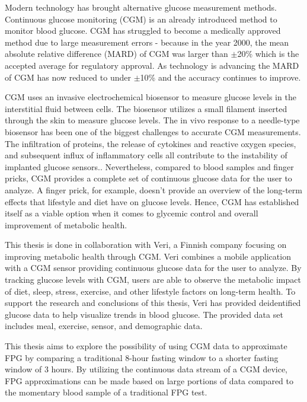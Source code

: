 \documentclass[english, 12pt, a4paper, elec, utf8, a-1b, online]{aaltothesis}
\begin{document}
Modern technology has brought alternative glucose measurement methods. 
Continuous glucose monitoring (CGM) is an already introduced method to 
monitor blood glucose\cite{danne_international_2017}. CGM 
has struggled to become a medically approved method due to
large measurement errors - because in the year 2000, the mean absolute relative difference
(MARD) of CGM was larger than $\pm$20\% which is the accepted average for 
regulatory approval. As technology is advancing the MARD of CGM has 
now reduced to under $\pm$10\% and the accuracy continues to improve\cite{rodbard_continuous_2016}\cite{gifford_cgm}.

CGM uses an invasive electrochemical biosensor to measure glucose levels
in the interstitial fluid between cells.
The biosensor utilizes a small filament inserted through the skin 
to measure glucose levels. The in vivo response to a needle-type 
biosensor has been one of the biggest challenges to accurate CGM
measurements. The infiltration of proteins, the release of cytokines 
and reactive oxygen species, and subsequent influx of 
inflammatory cells all contribute to the instability of implanted 
glucose sensors.\cite{gifford_cgm}. Nevertheless, compared to
blood samples and finger pricks, CGM provides a complete set 
of continuous glucose data for the user to analyze. A finger
prick, for example, doesn't provide an overview of the long-term
effects that lifestyle and diet have on glucose levels. Hence, CGM
has established itself as a viable option when it comes to 
glycemic control and overall improvement of metabolic health. 

This thesis is done in collaboration 
with Veri\cite{noauthor_veri_nodate}, a Finnish company focusing on improving 
metabolic health through CGM. Veri combines a mobile application with a CGM 
sensor providing continuous glucose data for the user to analyze. By tracking 
glucose levels with CGM, users are able to observe the metabolic impact
of diet, sleep, stress, exercise, and other lifestyle factors on long-term health. 
To support the research and conclusions of this thesis, Veri has 
provided deidentified glucose data to help visualize trends in blood glucose. The provided data set
includes meal, exercise, sensor, and demographic data. 

This thesis aims to explore the possibility of using CGM 
data to approximate FPG by comparing a traditional 8-hour fasting window to a shorter fasting window of 3 hours.
By utilizing the continuous data stream of a CGM device, FPG approximations can be made based 
on large portions of data compared to the momentary blood sample of a traditional FPG test\cite{the_expert_committee_on_the_diagnosis_and_classification_of_diabetes_mellitus_report_1997}.
 
\end{document}
